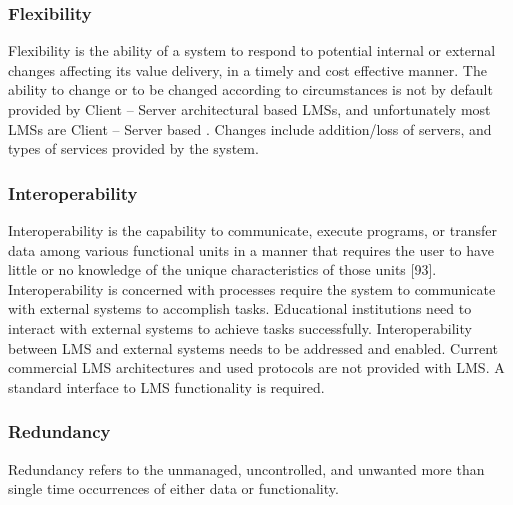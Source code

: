 \documentclass[12pt,a4paper,final,twoside,onecolumn,titlepage]{book}
\begin{document}
\subsubsection{Flexibility}
Flexibility is the ability of a system to respond to potential internal or external changes affecting its value delivery, in a timely and cost effective manner. The ability to change or to be changed according to circumstances is not by default provided by Client – Server architectural based \gls{LMS}s, and unfortunately most \gls{LMS}s are Client – Server based \cite{UMIS41}. Changes include addition/loss of servers, and types of services provided by the system.

\subsubsection{Interoperability}
Interoperability is the capability to communicate, execute programs, or transfer data among various functional units in a manner that requires the user to have little or no knowledge of the unique characteristics of those units [93]. Interoperability is concerned with processes require the system to communicate with external systems to accomplish tasks. Educational institutions need to interact with external systems to achieve tasks successfully. Interoperability between \gls{LMS} and external systems needs to be addressed and enabled. Current commercial \gls{LMS} architectures and used protocols are not provided with \gls{LMS}. A standard interface to \gls{LMS} functionality is required.

\subsubsection{Redundancy}
Redundancy refers to the unmanaged, uncontrolled, and unwanted more than single time occurrences of either data or functionality.
\end{document}
